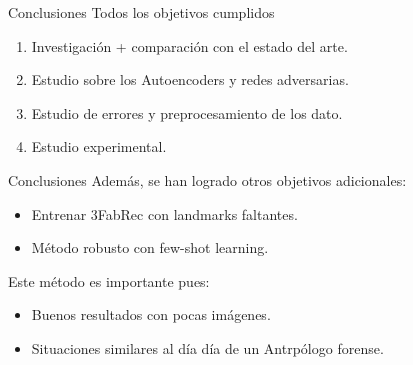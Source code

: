 \documentclass[aspectratio=43]{beamer}
\begin{document}
\begin{frame}{Conclusiones}
  Todos los objetivos cumplidos
  \begin{enumerate}
    \item Investigación + comparación con el estado del arte.
    \item Estudio sobre los Autoencoders y redes adversarias.
    \item Estudio de errores y preprocesamiento de los dato.
    \item Estudio experimental.
  \end{enumerate}
\end{frame}

\begin{frame}{Conclusiones}
  Además, se han logrado otros objetivos adicionales:
  \begin{itemize}
    \item Entrenar 3FabRec con landmarks faltantes.
    \item Método robusto con few-shot learning.
  \end{itemize}

  Este método es importante pues: 
  \begin{itemize}
    \item Buenos resultados con pocas imágenes.
    \item Situaciones similares al día día de un Antrpólogo forense.
  \end{itemize}
\end{frame}


\begin{frame}[allowframebreaks,t]{\bibname}
	\AtNextBibliography{\footnotesize}%
	\printbibliography
\end{frame}
\end{document}

